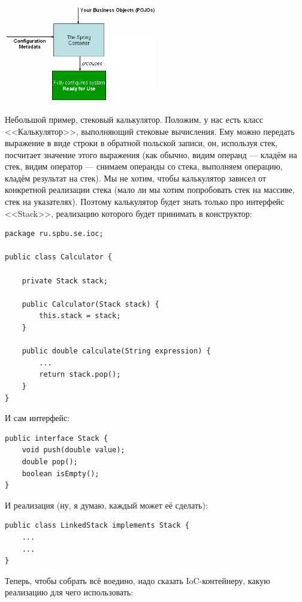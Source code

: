 \documentclass[a5paper]{article}
\begin{document}
\begin{center}
    \includegraphics[width=0.5\textwidth]{springIoC.png}
\end{center}

Небольшой пример, стековый калькулятор. Положим, у нас есть класс <<Калькулятор>>, выполняющий стековые вычисления. Ему можно передать выражение в виде строки в обратной польской записи, он, используя стек, посчитает значение этого выражения (как обычно, видим операнд --- кладём на стек, видим оператор --- снимаем операнды со стека, выполняем операцию, кладём результат на стек). Мы не хотим, чтобы калькулятор зависел от конкретной реализации стека (мало ли мы хотим попробовать стек на массиве, стек на указателях). Поэтому калькулятор будет знать только про интерфейс <<Stack>>, реализацию которого будет принимать в конструктор:

\begin{verbatim}
package ru.spbu.se.ioc;

public class Calculator {

    private Stack stack;

    public Calculator(Stack stack) {
        this.stack = stack;
    }

    public double calculate(String expression) {
        ...
        return stack.pop();
    }
}
\end{verbatim}

И сам интерфейс:

\begin{verbatim}
public interface Stack {
    void push(double value);
    double pop();
    boolean isEmpty();
}
\end{verbatim}

И реализация (ну, я думаю, каждый может её сделать):

\begin{verbatim}
public class LinkedStack implements Stack {
    ...
    ...
}
\end{verbatim}

Теперь, чтобы собрать всё воедино, надо сказать IoC-контейнеру, какую реализацию для чего использовать:
\end{document}
